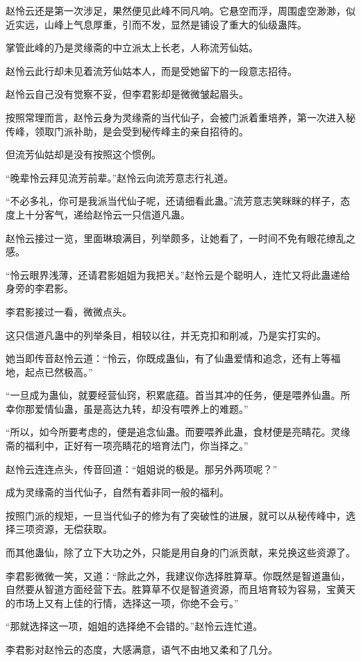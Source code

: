 \begin{this_body}
赵怜云还是第一次涉足，果然便见此峰不同凡响。它悬空而浮，周围虚空渺渺，似近实远，山峰上气息厚重，引而不发，显然是铺设了重大的仙级蛊阵。

掌管此峰的乃是灵缘斋的中立派太上长老，人称流芳仙姑。

赵怜云此行却未见着流芳仙姑本人，而是受她留下的一段意志招待。

赵怜云自己没有觉察不妥，但李君影却是微微皱起眉头。

按照常理而言，赵怜云身为灵缘斋的当代仙子，会被门派着重培养，第一次进入秘传峰，领取门派补助，是会受到秘传峰主的亲自招待的。

但流芳仙姑却是没有按照这个惯例。

“晚辈怜云拜见流芳前辈。”赵怜云向流芳意志行礼道。

“不必多礼，你可是我派当代仙子呢，还请细看此蛊。”流芳意志笑眯眯的样子，态度上十分客气，递给赵怜云一只信道凡蛊。

赵怜云接过一览，里面琳琅满目，列举颇多，让她看了，一时间不免有眼花缭乱之感。

“怜云眼界浅薄，还请君影姐姐为我把关。”赵怜云是个聪明人，连忙又将此蛊递给身旁的李君影。

李君影接过一看，微微点头。

这只信道凡蛊中的列举条目，相较以往，并无克扣和削减，乃是实打实的。

她当即传音赵怜云道：“怜云，你既成蛊仙，有了仙蛊爱情和追念，还有上等福地，起点已然极高。”

“一旦成为蛊仙，就要经营仙窍，积累底蕴。首当其冲的任务，便是喂养仙蛊。所幸你那爱情仙蛊，虽是高达九转，却没有喂养上的难题。”

“所以，如今所要考虑的，便是追念仙蛊。而要喂养此蛊，食材便是亮睛花。灵缘斋的福利中，正好有一项亮睛花的培育法门，你当择之。”

赵怜云连连点头，传音回道：“姐姐说的极是。那另外两项呢？”

成为灵缘斋的当代仙子，自然有着非同一般的福利。

按照门派的规矩，一旦当代仙子的修为有了突破性的进展，就可以从秘传峰中，选择三项资源，无偿获取。

而其他蛊仙，除了立下大功之外，只能是用自身的门派贡献，来兑换这些资源了。

李君影微微一笑，又道：“除此之外，我建议你选择胜算草。你既然是智道蛊仙，自然要从智道方面经营下去。胜算草不仅是智道资源，而且培育较为容易，宝黄天的市场上又有上佳的行情，选择这一项，你绝不会亏。”

“那就选择这一项，姐姐的选择绝不会错的。”赵怜云连忙道。

李君影对赵怜云的态度，大感满意，语气不由地又柔和了几分。


\end{this_body}
